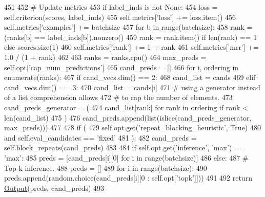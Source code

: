 \begin{DoxyCode}
451 
452         \textcolor{comment}{# Update metrics}
453         \textcolor{keywordflow}{if} label\_inds \textcolor{keywordflow}{is} \textcolor{keywordflow}{not} \textcolor{keywordtype}{None}:
454             loss = self.criterion(scores, label\_inds)
455             self.metrics[\textcolor{stringliteral}{'loss'}] += loss.item()
456             self.metrics[\textcolor{stringliteral}{'examples'}] += batchsize
457             \textcolor{keywordflow}{for} b \textcolor{keywordflow}{in} range(batchsize):
458                 rank = (ranks[b] == label\_inds[b]).nonzero()
459                 rank = rank.item() \textcolor{keywordflow}{if} len(rank) == 1 \textcolor{keywordflow}{else} scores.size(1)
460                 self.metrics[\textcolor{stringliteral}{'rank'}] += 1 + rank
461                 self.metrics[\textcolor{stringliteral}{'mrr'}] += 1.0 / (1 + rank)
462 
463         ranks = ranks.cpu()
464         max\_preds = self.opt[\textcolor{stringliteral}{'cap\_num\_predictions'}]
465         cand\_preds = []
466         \textcolor{keywordflow}{for} i, ordering \textcolor{keywordflow}{in} enumerate(ranks):
467             \textcolor{keywordflow}{if} cand\_vecs.dim() == 2:
468                 cand\_list = cands
469             \textcolor{keywordflow}{elif} cand\_vecs.dim() == 3:
470                 cand\_list = cands[i]
471             \textcolor{comment}{# using a generator instead of a list comprehension allows}
472             \textcolor{comment}{# to cap the number of elements.}
473             cand\_preds\_generator = (
474                 cand\_list[rank] \textcolor{keywordflow}{for} rank \textcolor{keywordflow}{in} ordering \textcolor{keywordflow}{if} rank < len(cand\_list)
475             )
476             cand\_preds.append(list(islice(cand\_preds\_generator, max\_preds)))
477 
478         \textcolor{keywordflow}{if} (
479             self.opt.get(\textcolor{stringliteral}{'repeat\_blocking\_heuristic'}, \textcolor{keyword}{True})
480             \textcolor{keywordflow}{and} self.eval\_candidates == \textcolor{stringliteral}{'fixed'}
481         ):
482             cand\_preds = self.block\_repeats(cand\_preds)
483 
484         \textcolor{keywordflow}{if} self.opt.get(\textcolor{stringliteral}{'inference'}, \textcolor{stringliteral}{'max'}) == \textcolor{stringliteral}{'max'}:
485             preds = [cand\_preds[i][0] \textcolor{keywordflow}{for} i \textcolor{keywordflow}{in} range(batchsize)]
486         \textcolor{keywordflow}{else}:
487             \textcolor{comment}{# Top-k inference.}
488             preds = []
489             \textcolor{keywordflow}{for} i \textcolor{keywordflow}{in} range(batchsize):
490                 preds.append(random.choice(cand\_preds[i][0 : self.opt[\textcolor{stringliteral}{'topk'}]]))
491 
492         \textcolor{keywordflow}{return} \hyperlink{namespaceparlai_1_1agents_1_1legacy__agents_1_1seq2seq_1_1torch__agent__v1_a2689006ea97d09413fb242f984bd8016}{Output}(preds, cand\_preds)
493 
\end{DoxyCode}

